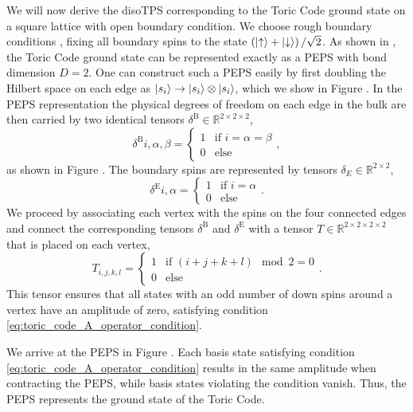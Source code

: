 We will now derive the disoTPS corresponding to the Toric Code ground state on a square lattice with open boundary condition. We choose rough boundary conditions \cite{cite:models_for_gapped_boundaries_and_domain_walls}, fixing all boundary spins to the state $\left(\ket{\uparrow} + \ket{\downarrow}\right)/\sqrt{2}$. As shown in \cite{cite:isometric_tensor_network_representation_of_string_net_liquids}, the Toric Code ground state can be represented exactly as a PEPS with bond dimension $D = 2$. One can construct such a PEPS easily by first doubling the Hilbert space on each edge as $\ket{s_i} \rightarrow \ket{s_i}\otimes\ket{s_i}$, which we show in Figure . In the PEPS representation the physical degrees of freedom on each edge in the bulk are then carried by two identical tensors $\delta^\text{B}\in\mathbb{R}^{2\times2\times2}$,
\begin{equation}
	\delta^\text{B}{i,\alpha,\beta} = \begin{cases}
		1 &\text{if }i=\alpha=\beta\\
		0 &\text{else}
	\end{cases},
\end{equation}
as shown in Figure . The boundary spins are represented by tensors $\delta_E\in\mathbb{R}^{2\times2}$,
\begin{equation}
	\delta^\text{E}{i,\alpha} = \begin{cases}
		1 &\text{if }i=\alpha\\
		0 &\text{else}
	\end{cases}.
\end{equation}
We proceed by associating each vertex with the spins on the four connected edges and connect the corresponding tensors $\delta^\text{B}$ and $\delta^\text{E}$ with a tensor $T\in\mathbb{R}^{2\times2\times2\times2}$ that is placed on each vertex,
\begin{equation}
	T_{i,j,k,l} = \begin{cases}
		1 & \text{if } \left(i+j+k+l\right)\mod2 = 0 \\
		0 & \text{else}
	\end{cases}.
\end{equation}
This tensor ensures that all states with an odd number of down spins around a vertex have an amplitude of zero, satisfying condition \eqref{eq:toric_code_A_operator_condition}. \par
We arrive at the PEPS in Figure . Each basis state satisfying condition \eqref{eq:toric_code_A_operator_condition} results in the same amplitude when contracting the PEPS, while basis states violating the condition vanish. Thus, the PEPS represents the ground state of the Toric Code. \par

